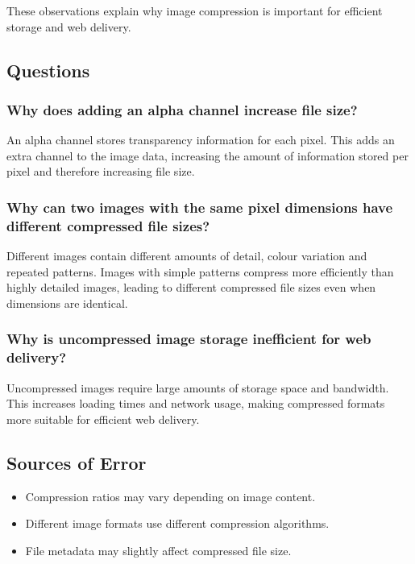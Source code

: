 \documentclass[12pt,a4paper]{article}
\begin{document}
These observations explain why image compression is important for efficient storage and web delivery.

\subsection{Questions}

\subsubsection{Why does adding an alpha channel increase file size?}

An alpha channel stores transparency information for each pixel. This adds an extra channel to the image data, increasing the amount of information stored per pixel and therefore increasing file size.

\subsubsection{Why can two images with the same pixel dimensions have different compressed file sizes?}

Different images contain different amounts of detail, colour variation and repeated patterns. Images with simple patterns compress more efficiently than highly detailed images, leading to different compressed file sizes even when dimensions are identical.

\subsubsection{Why is uncompressed image storage inefficient for web delivery?}

Uncompressed images require large amounts of storage space and bandwidth. This increases loading times and network usage, making compressed formats more suitable for efficient web delivery.

\subsection{Sources of Error}

\begin{itemize}
    \item Compression ratios may vary depending on image content.
    
    \item Different image formats use different compression algorithms.
    
    \item File metadata may slightly affect compressed file size.
\end{itemize}
\end{document}
